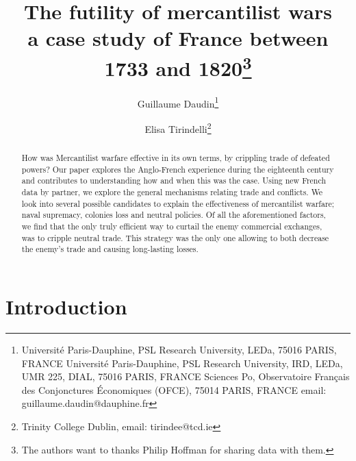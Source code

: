 \documentclass[12pt,a4paper,notitlepage,english]{article}
\author{
  Guillaume Daudin\thanks{Université Paris-Dauphine, PSL Research University, LEDa, 75016 PARIS, FRANCE Université Paris-Dauphine, PSL Research University, IRD, LEDa, UMR 225, DIAL, 75016 PARIS, FRANCE Sciences Po, Observatoire Français des Conjonctures Économiques (OFCE), 75014 PARIS, FRANCE email: guillaume.daudin@dauphine.fr}
  \and
  Elisa Tirindelli\thanks{Trinity College Dublin, email: tirindee@tcd.ie}
}
\title{The futility of mercantilist wars \\ a case study of France between 1733 and 1820\thanks{The authors want to thanks Philip Hoffman for sharing data with them.}}
\date{}
\begin{document}
\maketitle


\begin{abstract}
How was Mercantilist warfare effective in its own terms, by crippling trade of defeated powers? Our paper explores the Anglo-French experience during the eighteenth century and contributes to understanding how and when this was the case. Using new French data by partner, we explore the general mechanisms relating trade and conflicts. We look into several possible candidates to explain the effectiveness of mercantilist warfare; naval supremacy, colonies loss and neutral policies. Of all the aforementioned factors, we find that the only truly efficient way to curtail the enemy commercial exchanges, was to cripple neutral trade. This strategy was the only one allowing to both decrease the enemy's trade and causing long-lasting losses. 
\end{abstract}


\section{Introduction} \label{introduction}




\maketitle
\end{document}
